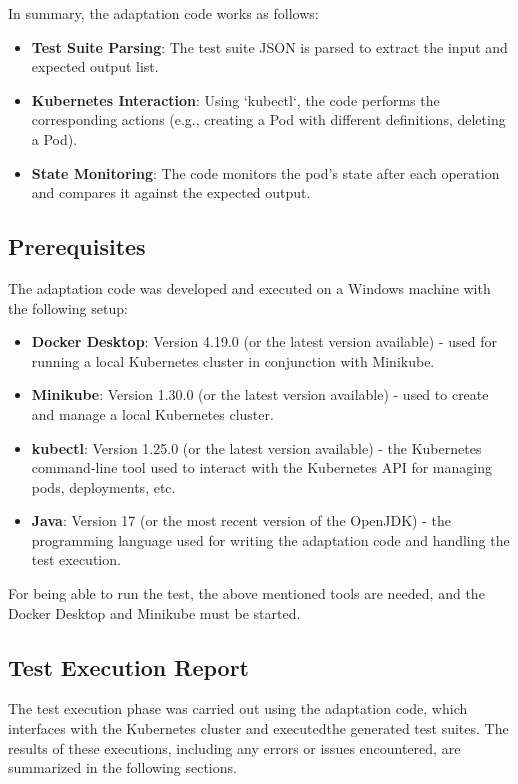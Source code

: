 \documentclass[main.tex]{subfiles}
\begin{document}
In summary, the adaptation code works as follows:
\begin{itemize}
    \item \textbf{Test Suite Parsing}: The test suite JSON is parsed to extract the input and expected output list.
    \item \textbf{Kubernetes Interaction}: Using `kubectl`, the code performs the corresponding actions (e.g., creating a Pod with different definitions, deleting a Pod).
    \item \textbf{State Monitoring}: The code monitors the pod's state after each operation and compares it against the expected output.
\end{itemize}


\subsection{Prerequisites}
The adaptation code was developed and executed on a Windows machine with the following setup:

\begin{itemize}
    \item \textbf{Docker Desktop}: Version 4.19.0 (or the latest version available) - used for running a local Kubernetes cluster in conjunction with Minikube.
    \item \textbf{Minikube}: Version 1.30.0 (or the latest version available) - used to create and manage a local Kubernetes cluster.
    \item \textbf{kubectl}: Version 1.25.0 (or the latest version available) - the Kubernetes command-line tool used to interact with the Kubernetes API for managing pods, deployments, etc.
    \item \textbf{Java}: Version 17 (or the most recent version of the OpenJDK) - the programming language used for writing the adaptation code and handling the test execution.
\end{itemize}
For being able to run the test, the above mentioned tools are needed, and the Docker Desktop and Minikube must be started.

\subsection{Test Execution Report}
The test execution phase was carried out using the adaptation code, which interfaces with the Kubernetes cluster and executedthe generated test suites. The results of these executions, including any errors or issues encountered, are summarized in the following sections.
\end{document}
